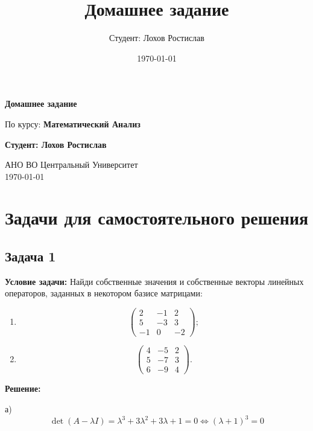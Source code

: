 \documentclass[a4paper,12pt]{article}
\title{Домашнее задание}
\author{Студент: Лохов Ростислав}
\date{\today}
\begin{document}
\begin{titlepage}
    \centering
    \vspace*{1cm}

    \Huge
    \textbf{Домашнее задание}

    \vspace{0.5cm}
    \LARGE
    По курсу: \textbf{Математический Анализ}

    \vspace{1.5cm}

    \textbf{Студент: Лохов Ростислав}

    \vfill

    \Large
    АНО ВО Центральный Университет\\
    \vspace{0.3cm}
    \today

\end{titlepage}

\tableofcontents
\newpage

\section{Задачи для самостоятельного решения}

\subsection{Задача 1}
\textbf{Условие задачи:} Найди собственные значения и собственные векторы линейных операторов, заданных в некотором базисе матрицами:
\begin{enumerate}
    \item 
    \[
    \begin{pmatrix}
    2 & -1 & 2 \\
    5 & -3 & 3 \\
    -1 & 0 & -2
    \end{pmatrix};
    \]
    \item 
    \[
    \begin{pmatrix}
    4 & -5 & 2 \\
    5 & -7 & 3 \\
    6 & -9 & 4
    \end{pmatrix}.
    \]
\end{enumerate}

\textbf{Решение: }

а)
\[
\det(A-\lambda I) = \lambda^3+3\lambda^2+3\lambda + 1 = 0 \Longleftrightarrow (\lambda + 1)^3=0
\]
\end{document}
